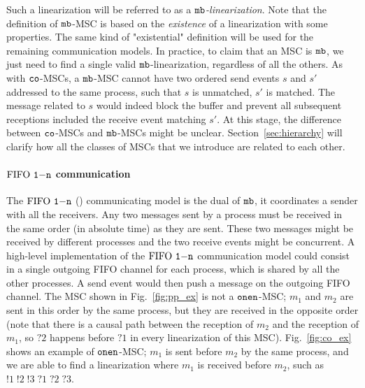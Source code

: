 Such a linearization will be referred to as a \emph{$\mathtt{mb}$-linearization}. Note that the definition of $\mathtt{mb}$-MSC is based on the \emph{existence} of a linearization with some properties. The same kind of "existential" definition will be used for the remaining communication models. In practice, to claim that an MSC is $\mathtt{mb}$, we just need to find a single valid $\mathtt{mb}$-linearization, regardless of all the others. As with $\mathtt{co}$-MSCs, a $\mathtt{mb}$-MSC cannot have two ordered send events $s$ and $s'$ addressed to the same process, such that $s$ is unmatched, $s'$ is matched. The message related to $s$ would indeed block the buffer and prevent all subsequent receptions included the receive event matching $s'$. 
%
%
At this stage, the difference between $\mathtt{co}$-MSCs and $\mathtt{mb}$-MSCs might be unclear. Section~\ref{sec:hierarchy} will clarify how all the classes of MSCs that we introduce are related to each other.


\paragraph{\bf  $\text{FIFO } \mathtt{1\mathsf{-}n}$ communication}
The $\text{FIFO } \mathtt{1\mathsf{-}n}$ (\onensymb) communicating model is the dual of $\mathtt{mb}$, it coordinates a sender with all the receivers. Any two messages sent by a process  must be received in the same order (in absolute time) as they are sent. These two messages might be received by different processes and the two receive events might be concurrent.
A high-level implementation of the $\text{FIFO } \mathtt{1\mathsf{-}n}$ communication model could consist in a single outgoing FIFO channel for each process, which is shared by all the other processes. A send event would then push a message on the outgoing FIFO channel.
The MSC shown in Fig.~\ref{fig:pp_ex} is not a $\mathtt{onen}$-MSC; $m_1$ and $m_2$ are sent in this order by the same process, but they are received in the opposite order (note that there is a causal path between the reception of $m_2$ and the reception of $m_1$, so $?2$ happens before $?1$ in every linearization of this MSC). Fig.~\ref{fig:co_ex} shows an example of $\mathtt{onen}$-MSC; $m_1$ is sent before $m_2$ by the same process, and we are able to find a linearization where $m_1$ is received before $m_2$, such as $!1\;!2\;!3\;?1\;?2\;?3$. 


